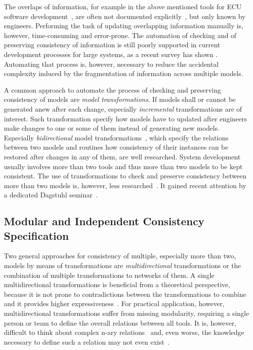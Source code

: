 The overlaps of information, for example in the above mentioned tools for \gls{ECU} software development~\cite{giese2010a}, are often not documented explicitly~\cite{mazkatli2017ase}, but only known by engineers.
Performing the task of updating overlapping information manually is, however, time-consuming and error-prone.
The automation of checking and of preserving consistency of information is still poorly supported in current development processes for large systems, as a recent survey has shown .
Automating that process is, however, necessary to reduce the accidental complexity induced by the fragmentation of information across multiple models.

A common approach to automate the process of checking and preserving consistency of models are \emph{model transformations}.
If models shall or cannot be generated anew after each change, especially \emph{incremental} transformations are of interest.
Such transformation specify how models have to updated after engineers make changes  to one or some of them instead of generating new models.
Especially \emph{bidirectional} model transformations~\cite{stevens2010sosym}, which specify the relations between two models and routines how consistency of their instances can be restored after changes in any of them, are well researched.
System development usually involves more than two tools and thus more than two models to be kept consistent.
The use of transformations to check and preserve consistency between more than two models is, however, less researched~\cite{stevens2020BidirectionalTransformationLarge-SoSym}.
It gained recent attention by a dedicated Dagstuhl seminar~\cite{cleve2019dagstuhl}.


\subsection{Modular and Independent Consistency Specification}

Two general approaches for consistency of multiple, especially more than two, models by means of transformations are \emph{multidirectional} transformations or the combination of multiple transformations to networks of them.
A single multidirectional transformations is beneficial from a theoretical perspective, because it is not prone to contradictions between the transformations to combine and it provides higher expressiveness~\cite{stevens2020BidirectionalTransformationLarge-SoSym}.
For practical application, however, multidirectional transformations suffer from missing modularity, requiring a single person or team to define the overall relations between all tools.
It is, however, difficult to think about complex n-ary relations~\cite{stevens2020BidirectionalTransformationLarge-SoSym} and, even worse, the knowledge necessary to define such a relation may not even exist~.

